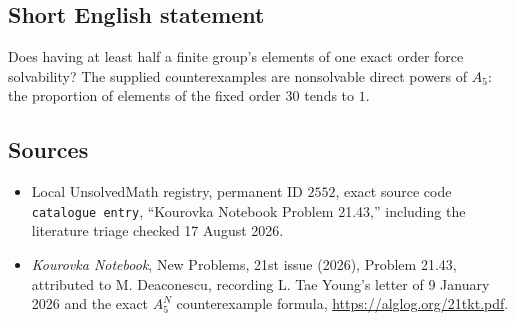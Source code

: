 \documentclass[11pt]{article}
\begin{document}
\subsection{Short English statement}
Does having at least half a finite group's elements of one exact order force solvability? The supplied counterexamples are nonsolvable direct powers of $A_5$: the proportion of elements of the fixed order $30$ tends to $1$.
\subsection{Sources}
\begin{itemize}
\item Local UnsolvedMath registry, permanent ID $2552$, exact source code \texttt{catalogue entry}, ``Kourovka Notebook Problem 21.43,'' including the literature triage checked 17 August 2026.
\item \emph{Kourovka Notebook}, New Problems, 21st issue (2026), Problem 21.43, attributed to M. Deaconescu, recording L. Tae Young's letter of 9 January 2026 and the exact $A_5^N$ counterexample formula, \url{https://alglog.org/21tkt.pdf}.
\end{itemize}
\end{document}
